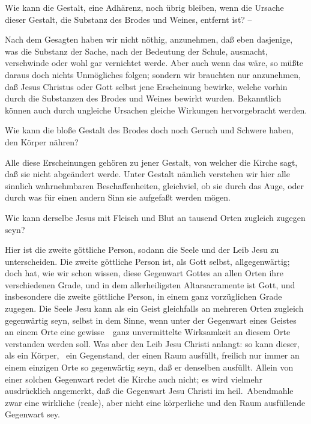 \begin{aufza}
\item {} Wie kann die Gestalt, eine Adhärenz, noch übrig bleiben, wenn die Ursache dieser Gestalt, die Substanz des Brodes und Weines, entfernt ist? -- \par
{} Nach dem Gesagten haben wir nicht nöthig, anzunehmen, daß eben dasjenige, was die Substanz der Sache, nach der Bedeutung der Schule, ausmacht, verschwinde oder wohl gar vernichtet werde. Aber auch wenn das wäre, so müßte daraus doch nichts Unmögliches folgen; sondern wir brauchten nur anzunehmen, daß Jesus Christus oder Gott selbst jene Erscheinung bewirke, welche vorhin durch die Substanzen des Brodes und Weines bewirkt wurden. Bekanntlich können auch durch ungleiche Ursachen gleiche Wirkungen hervorgebracht werden.
\item {} Wie kann die bloße Gestalt des Brodes doch noch Geruch und Schwere haben, den Körper nähren? \usw\par
{} Alle diese Erscheinungen gehören zu jener Gestalt, von welcher die Kirche sagt, daß sie nicht abgeändert werde. Unter Gestalt nämlich verstehen wir hier alle sinnlich wahrnehmbaren Beschaffenheiten, gleichviel, ob sie durch das Auge, oder durch was für einen andern Sinn sie aufgefaßt werden mögen.
\item {} Wie kann derselbe Jesus mit Fleisch und Blut an tausend Orten zugleich zugegen seyn?\par
{} Hier ist die zweite göttliche Person, sodann die Seele und der Leib Jesu zu unterscheiden. Die zweite göttliche Person ist, als Gott selbst, allgegenwärtig; doch hat, wie wir schon wissen, diese Gegenwart Gottes an allen Orten ihre verschiedenen Grade, und in dem allerheiligsten Altarsacramente ist Gott, und insbesondere die zweite göttliche Person, in einem ganz vorzüglichen Grade zugegen. Die Seele Jesu kann als ein Geist gleichfalls an mehreren Orten zugleich gegenwärtig seyn, selbst in dem Sinne, wenn unter der Gegenwart eines Geistes an einem Orte eine gewisse~\ ganz unvermittelte Wirksamkeit an diesem Orte verstanden werden soll. Was aber den Leib Jesu Christi anlangt: so kann dieser, als ein Körper, \dh\  ein Gegenstand, der einen Raum ausfüllt, freilich nur immer an einem einzigen Orte so gegenwärtig seyn, daß er denselben ausfüllt. Allein von einer solchen Gegenwart redet die Kirche auch nicht; es wird vielmehr ausdrücklich angemerkt, daß die  Gegenwart Jesu Christi im heil.\ Abendmahle zwar eine wirkliche (reale), aber nicht eine körperliche und den Raum ausfüllende Gegenwart sey.

\end{aufza}
